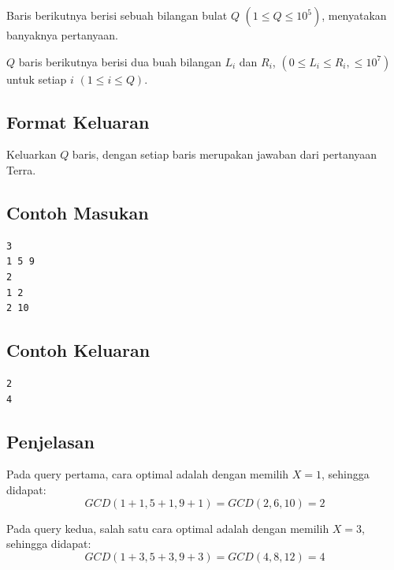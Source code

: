 \documentclass{article}
\begin{document}
Baris berikutnya berisi sebuah bilangan bulat $Q$ $(1 \leq Q \leq 10^5)$, menyatakan banyaknya pertanyaan.

$Q$ baris berikutnya berisi dua buah bilangan $L_i$ dan $R_i$, $(0 \leq L_i \leq R_i, \leq 10^7)$ untuk setiap $i$ $(1 \leq i \leq Q)$.

\subsection*{Format Keluaran}
Keluarkan $Q$ baris, dengan setiap baris merupakan jawaban dari pertanyaan Terra.

\begin{multicols}{2}
\subsection*{Contoh Masukan}
\begin{lstlisting}
3
1 5 9
2
1 2
2 10
\end{lstlisting}
\columnbreak
\subsection*{Contoh Keluaran}
\begin{lstlisting}
2
4
\end{lstlisting}
\vfill
\null
\end{multicols}


\subsection*{Penjelasan}

Pada query pertama, cara optimal adalah dengan memilih $X = 1$, sehingga didapat:
$$GCD(1+1,5+1,9+1) = GCD(2,6,10) = 2$$

Pada query kedua, salah satu cara optimal adalah dengan memilih $X = 3$, sehingga didapat:
$$GCD(1+3,5+3,9+3) = GCD(4,8,12) = 4$$

\pagebreak
\end{document}
